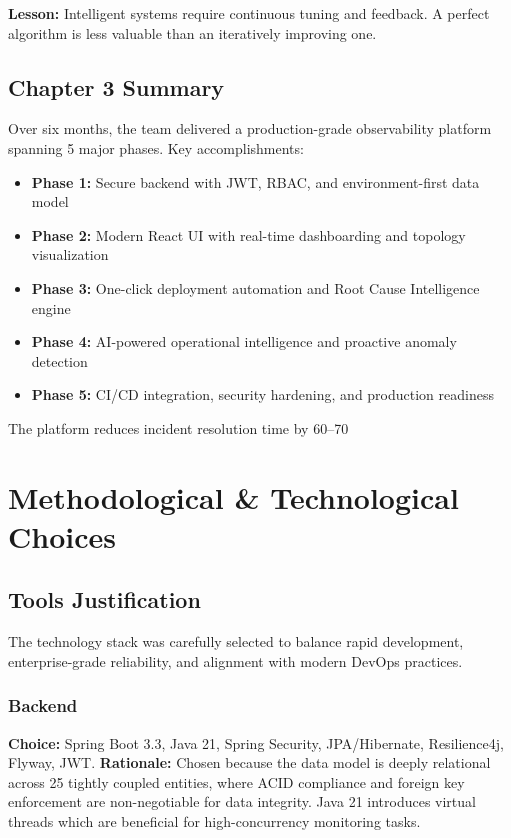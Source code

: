 \documentclass[12pt,a4paper]{report}
\begin{document}
\textbf{Lesson:} Intelligent systems require continuous tuning and feedback. A perfect algorithm is less valuable than an iteratively improving one.

\section{Chapter 3 Summary}

Over six months, the team delivered a production-grade observability platform spanning 5 major phases. Key accomplishments:

\begin{itemize}
  \item \textbf{Phase 1:} Secure backend with JWT, RBAC, and environment-first data model
  \item \textbf{Phase 2:} Modern React UI with real-time dashboarding and topology visualization
  \item \textbf{Phase 3:} One-click deployment automation and Root Cause Intelligence engine
  \item \textbf{Phase 4:} AI-powered operational intelligence and proactive anomaly detection
  \item \textbf{Phase 5:} CI/CD integration, security hardening, and production readiness
\end{itemize}

The platform reduces incident resolution time by 60–70%

\newpage

\chapter{Methodological \& Technological Choices}

\section{Tools Justification}

The technology stack was carefully selected to balance rapid development, enterprise-grade reliability, and alignment with modern DevOps practices.

\subsection{Backend}
\textbf{Choice:} Spring Boot 3.3, Java 21, Spring Security, JPA/Hibernate, Resilience4j, Flyway, JWT.
\newline
\textbf{Rationale:} Chosen because the data model is deeply relational across 25 tightly coupled entities, where ACID compliance and foreign key enforcement are non-negotiable for data integrity. Java 21 introduces virtual threads which are beneficial for high-concurrency monitoring tasks.
\end{document}
